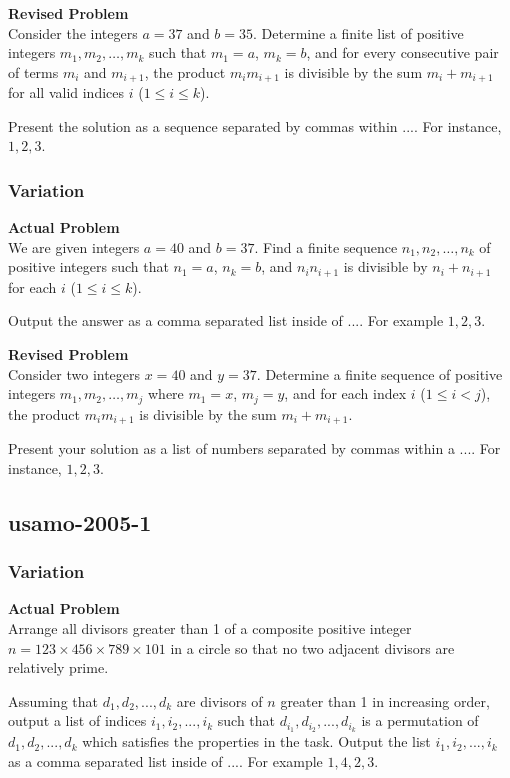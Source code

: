 \textbf{Revised Problem}\\
Consider the integers $a = 37$ and $b = 35$. Determine a finite list of positive integers $m_1, m_2, \ldots, m_k$ such that $m_1 = a$, $m_k = b$, and for every consecutive pair of terms $m_i$ and $m_{i+1}$, the product $m_i m_{i+1}$ is divisible by the sum $m_i + m_{i+1}$ for all valid indices $i$ ($1 \leq i \leq k$).

Present the solution as a sequence separated by commas within $\boxed{...}$. For instance, $\boxed{1, 2, 3}$.

\subsubsection{Variation}
\textbf{Actual Problem}\\
We are given integers $a = 40$ and $b = 37$. Find a finite sequence $n_1, n_2, \ldots, n_k$ of positive integers such that $n_1 = a$, $n_k = b$, and $n_in_{i+1}$ is divisible by $n_i + n_{i+1}$ for each $i$ ($1 \le i \le k$).

Output the answer as a comma separated list inside of $\boxed{...}$. For example $\boxed{1, 2, 3}$.

\textbf{Revised Problem}\\
Consider two integers $x = 40$ and $y = 37$. Determine a finite sequence of positive integers $m_1, m_2, \ldots, m_j$ where $m_1 = x$, $m_j = y$, and for each index $i$ ($1 \le i < j$), the product $m_i m_{i+1}$ is divisible by the sum $m_i + m_{i+1}$.

Present your solution as a list of numbers separated by commas within a $\boxed{...}$. For instance, $\boxed{1, 2, 3}$.

\subsection{usamo-2005-1}
\subsubsection{Variation}
\textbf{Actual Problem}\\
Arrange all divisors greater than 1 of a composite positive integer $n = 123 \times 456 \times 789 \times 101$ in a circle so that no two adjacent divisors are relatively prime.

Assuming that $d_1, d_2, ..., d_k$ are divisors of $n$ greater than 1 in increasing order, output a list of indices $i_1, i_2, ..., i_k$ such that $d_{i_1}, d_{i_2}, ..., d_{i_k}$ is a permutation of $d_1, d_2, ..., d_k$ which satisfies the properties in the task.
Output the list $i_1, i_2, ..., i_k$ as a comma separated list inside of $\boxed{...}$. For example $\boxed{1, 4, 2, 3}$.

